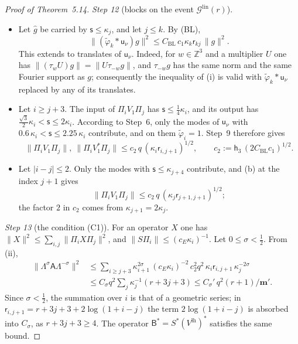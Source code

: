 \documentclass[11pt]{amsart}
\theoremstyle{definition}
\begin{document}
\begin{proof}[Proof of Theorem~5.14]
\emph{Step 12} (blocks on the event $\mathcal G^{\mathrm{lin}}(r)$).
\begin{itemize}
\item[(i)] Let $\hat g$ be carried by $\mathsf s\le\kappa_j$, and let $j\le k$.
By (BL),
\begin{equation*}
\|(\tilde\varphi_k*\mathsf u_\nu)g\|^2\le C_{\mathrm{BL}}\,c_1\kappa_k\mathsf r_{kj}\,\|g\|^2.
\end{equation*}
This extends to translates of $\mathsf u_\nu$.
Indeed, for $w\in\mathbb Z^3$ and a multiplier $U$ one has $\|(\tau_wU)g\|=\|U\tau_{-w}g\|$, and $\tau_{-w}g$ has the same norm and the same Fourier support as $g$;
consequently the inequality of (i) is valid with $\tilde\varphi_k*\mathsf u_\nu$ replaced by any of its translates.
\item[(ii)] Let $i\ge j+3$.
The input of $\Pi_iV_1\Pi_j$ has $\mathsf s\le\frac14\kappa_i$, and its output has $\frac{\sqrt3}{2}\kappa_i<\mathsf s\le2\kappa_i$.
According to Step~6, only the modes of $\mathsf u_\nu$ with $0.6\,\kappa_i<\mathsf s\le2.25\,\kappa_i$ contribute, and on them $\tilde\varphi_i=1$.
Step~9 therefore gives
\begin{equation*}
\|\Pi_iV_1\Pi_j\|,\ \|\Pi_iV_1^*\Pi_j\|\le c_2\,q\,(\kappa_i\mathsf r_{i,j+1})^{1/2},\qquad c_2:=\mathsf h_3\,(2C_{\mathrm{BL}}c_1)^{1/2}.
\end{equation*}
\item[(iii)] Let $|i-j|\le2$.
Only the modes with $\mathsf s\le\kappa_{j+4}$ contribute, and (b) at the index $j+1$ gives
\begin{equation*}
\|\Pi_iV_1\Pi_j\|\le c_2\,q\,(\kappa_j\mathsf r_{j+1,j+1})^{1/2};
\end{equation*}
the factor $2$ in $c_2$ comes from $\kappa_{j+1}=2\kappa_j$.
\end{itemize}

\emph{Step 13} (the condition (C1)).
For an operator $X$ one has $\|X\|^2\le\sum_{i,j}\|\Pi_iX\Pi_j\|^2$, and $\|S\Pi_i\|\le(c_E\kappa_i)^{-1}$.
Let $0\le\sigma<\frac12$.
From (ii),
\begin{align*}
\|\Lambda^\sigma\mathsf A\Lambda^{-\sigma}\|^2&\le\sum_{i\ge j+3}\kappa_{i+1}^{2\sigma}\,(c_E\kappa_i)^{-2}\,c_2^2q^2\,\kappa_i\mathsf r_{i,j+1}\,\kappa_j^{-2\sigma}\\
&\le C_\sigma q^2\sum_j\kappa_j^{-1}(r+3j+3)\le C_\sigma'\,q^2(r+1)/\mathbf m'.
\end{align*}
Since $\sigma<\frac12$, the summation over $i$ is that of a geometric series;
in $\mathsf r_{i,j+1}=r+3j+3+2\log(1+i-j)$ the term $2\log(1+i-j)$ is absorbed into $C_\sigma$, as $r+3j+3\ge4$.
The operator $\mathsf B^*=S^*(V^{\mathrm{lh}})^*$ satisfies the same bound.


\end{proof}
\end{document}
